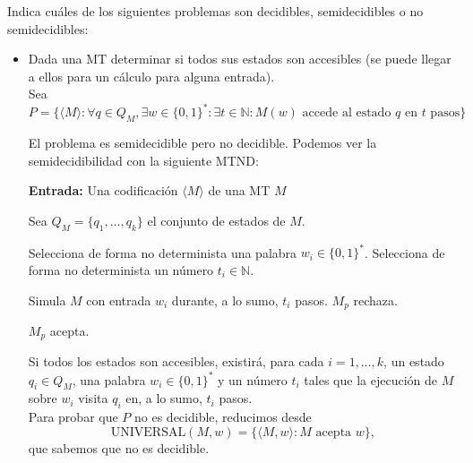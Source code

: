 \begin{ejercicio}
    Indica cuáles de los siguientes problemas son decidibles, semidecidibles o no semidecidibles:
    \begin{itemize}
        \item[a)] Dada una MT determinar si todos sus estados son accesibles 
        (se puede llegar a ellos para un cálculo para alguna entrada). \\

        Sea $$P = \{\langle M \rangle : \forall q \in Q_M, \exists w \in \{0,1\}^{*} : \exists t \in \mathbb{N} : M(w) 
        \text{ accede al estado } q \text{ en } t \text{ pasos} \}$$

        El problema es semidecidible pero no decidible. Podemos ver la semidecidibilidad con la siguiente MTND:

        \begin{algorithm}
            \caption{MTND $M_{P}$}
            \label{algorithm:estados-accesibles-semidecidible}
            \begin{algorithmic}
                \State \textbf{Entrada:} Una codificación $\langle M\rangle$ de una MT $M$

                \State Sea $Q_M=\{q_1,\dots,q_k\}$ el conjunto de estados de $M$.

                    \State Selecciona de forma no determinista una palabra $w_i\in\{0,1\}^{*}$.
                    \State Selecciona de forma no determinista un número $t_i\in\mathbb{N}$.
                \EndFor

                    \State Simula $M$ con entrada $w_i$ durante, a lo sumo, $t_i$ pasos.
                        \State $M_p$ rechaza.
                    \EndIf
                \EndFor

                \State $M_p$ acepta.
            \end{algorithmic}
        \end{algorithm}

        Si todos los estados son accesibles, existirá, para cada $i = 1, \ldots, k$, un estado $q_i \in Q_M$, una palabra 
        $w_i \in \{0,1\}^{*}$ y un número $t_i$ tales que la ejecución de $M$ sobre $w_i$ visita $q_i$ en, a lo sumo,
        $t_i$ pasos. \\

        Para probar que $P$ no es decidible, reducimos desde
        $$\text{UNIVERSAL}(M,w)=\{\langle M,w\rangle : M \text{ acepta } w\},$$
        que sabemos que no es decidible.


\end{itemize}
\end{ejercicio}
